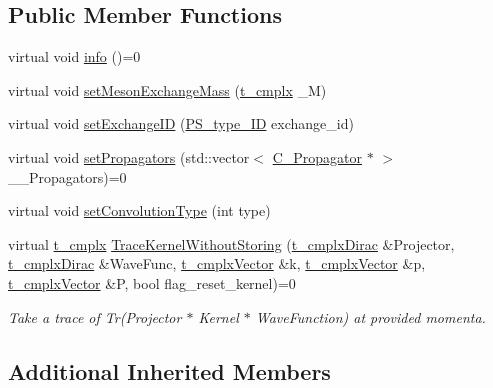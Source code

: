 \subsection*{Public Member Functions}
\begin{DoxyCompactItemize}
\item 
virtual void \hyperlink{class_c___abstract_kernel_a6a6510a5e44b78d22c6b1287121074c7}{info} ()=0
\item 
virtual void \hyperlink{class_c___abstract_kernel_a3ddf249443911202a298379b5f7f811e}{set\-Meson\-Exchange\-Mass} (\hyperlink{types_8h_aa75ae339052372f671bb263e6a272e82}{t\-\_\-cmplx} \-\_\-\-M)
\item 
virtual void \hyperlink{class_c___abstract_kernel_a38570b2b3a495089cd0c75d295f187a6}{set\-Exchange\-I\-D} (\hyperlink{_abstract_kernel_8hpp_a7d489d4c6a933f94b90a630d2851e68d}{P\-S\-\_\-type\-\_\-\-I\-D} exchange\-\_\-id)
\item 
virtual void \hyperlink{class_c___abstract_kernel_aa03ac5e1a4f9f187dc78abdd43a21c06}{set\-Propagators} (std\-::vector$<$ \hyperlink{class_c___propagator}{C\-\_\-\-Propagator} $\ast$ $>$ \-\_\-\-\_\-\-Propagators)=0
\item 
virtual void \hyperlink{class_c___abstract_kernel_a44d9413f79dcb3581f6f626dcaabda94}{set\-Convolution\-Type} (int type)
\item 
virtual \hyperlink{types_8h_aa75ae339052372f671bb263e6a272e82}{t\-\_\-cmplx} \hyperlink{class_c___abstract_kernel_a14425133289d90dcd8213f98f4f538d1}{Trace\-Kernel\-Without\-Storing} (\hyperlink{types_8h_ae924474dbd8b75d3e13a2674c4a06787}{t\-\_\-cmplx\-Dirac} \&Projector, \hyperlink{types_8h_ae924474dbd8b75d3e13a2674c4a06787}{t\-\_\-cmplx\-Dirac} \&Wave\-Func, \hyperlink{types_8h_ae8d0d77d0edff801ba45e425c85cf87d}{t\-\_\-cmplx\-Vector} \&k, \hyperlink{types_8h_ae8d0d77d0edff801ba45e425c85cf87d}{t\-\_\-cmplx\-Vector} \&p, \hyperlink{types_8h_ae8d0d77d0edff801ba45e425c85cf87d}{t\-\_\-cmplx\-Vector} \&P, bool flag\-\_\-reset\-\_\-kernel)=0
\begin{DoxyCompactList}\small\item\em Take a trace of Tr(\-Projector $\ast$ Kernel $\ast$ Wave\-Function) at provided momenta. \end{DoxyCompactList}\end{DoxyCompactItemize}
\subsection*{Additional Inherited Members}


